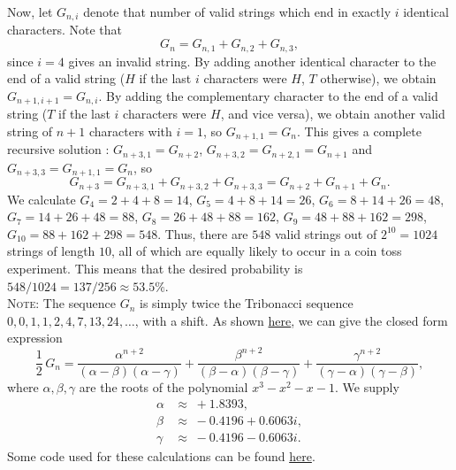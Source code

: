\documentclass[10pt]{article}
\newcounter{prob}
\begin{document}
        Now, let $G_{n, i}$ denote that number of valid strings which end in exactly 
        $i$ identical characters. Note that \[
            G_n = G_{n,1} + G_{n, 2} + G_{n, 3},
        \] since $i = 4$ gives an invalid string. By adding another identical
        character to the end of a valid string ($H$ if the last $i$ characters were
        $H$, $T$ otherwise), we obtain $G_{n + 1, i + 1} = G_{n, i}$.  By adding the
        complementary character to the end of a valid string ($T$ if the last $i$
        characters were $H$, and vice versa), we obtain another valid string of $n +
        1$ characters with $i = 1$, so $G_{n + 1, 1} = G_{n}$.  This  gives a
        complete recursive solution : $G_{n + 3, 1} = G_{n + 2}$, $G_{n + 3, 2} =
        G_{n + 2, 1} = G_{n + 1}$ and $G_{n + 3, 3} = G_{n + 1, 1} = G_n$, so \[
            G_{n + 3} = G_{n + 3, 1} + G_{n + 3, 2} + G_{n + 3, 3} = G_{n + 2} +
            G_{n + 1} + G_n.
        \] We calculate $G_4 = 2 + 4 + 8 = 14$, $G_5 = 4 + 8 + 14 = 26$, $G_6 = 8 +
        14 + 26 = 48$, $G_7 = 14 + 26 + 48 = 88$, $G_8 = 26 + 48 + 88 = 162$, $G_9 =
        48 + 88 + 162 = 298$, $G_{10} = 88 + 162 + 298 = 548$.  Thus, there are
        $548$ valid strings out of $2^{10} = 1024$ strings of length $10$, all of
        which are equally likely to occur in a coin toss experiment.  This means
        that the desired probability is $548 / 1024 = 137 / 256 \approx 53.5\%$. \\

        \textsc{Note}:
        The sequence $G_n$ is simply twice the Tribonacci sequence $0, 0, 1, 1, 2,
        4, 7, 13, 24, \dots$, with a shift. As shown 
        \href{https://sahasatvik.github.io/kbonacci/}{here}, we can give the
        closed form expression \[
            \frac{1}{2}\, G_n = 
            \frac{\alpha^{n + 2}}{(\alpha - \beta)(\alpha - \gamma)} +
            \frac{\beta^{n + 2}}{(\beta - \alpha)(\beta - \gamma)} +
            \frac{\gamma^{n + 2}}{(\gamma - \alpha)(\gamma - \beta)},
        \] where $\alpha, \beta, \gamma$ are the roots of the polynomial $x^3 - x^2
        - x - 1$. We supply \[
            \begin{array}{rl}
                \alpha &\approx\; +1.8393, \\
                \beta  &\approx\; -0.4196 + 0.6063i, \\
                \gamma &\approx\; -0.4196 - 0.6063i.
            \end{array}
        \] Some code used for these calculations can be found
        \href{https://gist.github.com/sahasatvik/f107fe8789913954c10ecf0b56e20c52}{here}.
        \\
\end{document}
